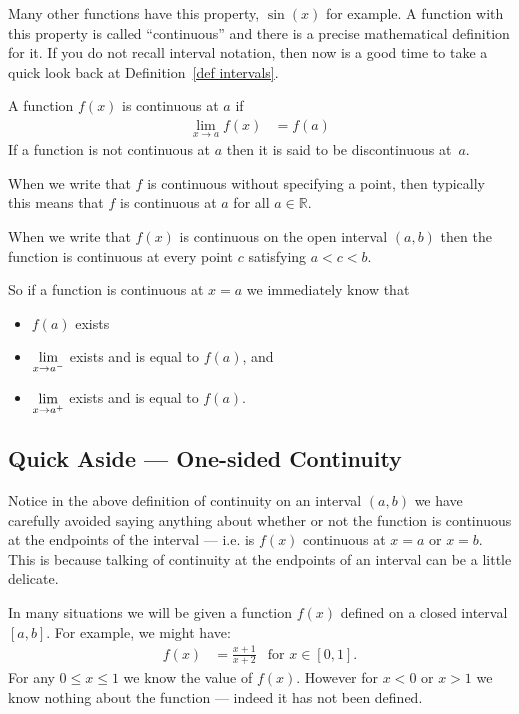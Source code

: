 Many other functions have this property, $\sin(x)$ for example. A function
with this property is called ``continuous'' and there is a precise mathematical definition
for it. If you do not recall interval notation, then now is a good time to take a quick
look back at Definition~\ref{def intervals}.
\begin{defn}
A function $f(x)$ is continuous at $a$ if
\begin{align*}
	\lim_{x \to a} f(x) &= f(a)
\end{align*}
If a function is not continuous at $a$ then it is said to be discontinuous
at~$a$.

When we write that $f$ is continuous without specifying a point, then typically
this means that $f$ is continuous at $a$ for all $a \in \mathbb{R}$.

When we write that $f(x)$ is continuous on the open interval $(a,b)$ then the function is
continuous at every point $c$ satisfying $a<c<b$.
\end{defn}

So if a function is continuous at $x=a$ we immediately know that
\begin{itemize}
 \item $f(a)$ exists
 \item $\displaystyle \lim_{x \to a^-}$ exists and is equal to $f(a)$, and
 \item $\displaystyle \lim_{x \to a^+}$ exists and is equal to $f(a)$.
\end{itemize}

\subsection*{Quick Aside --- One-sided Continuity}
Notice in the above definition of continuity on an interval $(a,b)$ we have carefully
avoided saying anything about whether or not the function is continuous at the endpoints
of the interval --- i.e. is $f(x)$ continuous at $x=a$ or $x=b$. This is because talking
of
continuity at the endpoints of an interval can be a little delicate.

In many situations we will be given a function $f(x)$ defined on a closed interval
$[a,b]$. For example, we might have:
\begin{align*}
  f(x) &= \frac{x+1}{x+2} & \text{for $x \in [0,1]$}.
\end{align*}
For any $0 \leq x \leq 1$ we know the value of $f(x)$. However for $x<0$ or $x>1$ we
know nothing about the function --- indeed it has not been defined.

